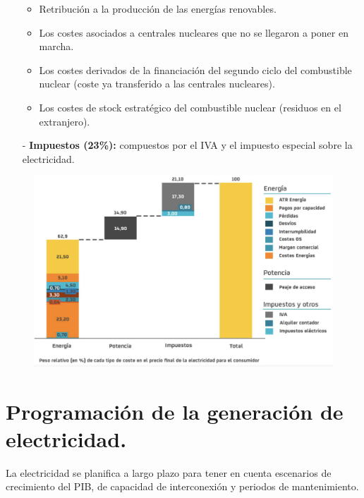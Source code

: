 \begin{itemize}
	\begin{itemize}
		\item Retribución a la producción de las energías renovables.
		\item Los costes asociados a centrales nucleares que no se llegaron a poner en marcha.
		\item Los costes derivados de la financiación del segundo ciclo del combustible nuclear (coste ya transferido a las centrales nucleares).
		\item Los costes de stock estratégico del combustible nuclear (residuos en el extranjero).
	\end{itemize}
	\item [-]\textbf{Impuestos (23\%):} compuestos por el IVA y el impuesto especial sobre la electricidad.
	
\end{itemize}
\begin{figure}[H]
	\centering
	\includegraphics[width=0.7\linewidth]{res/tema4/pvpc}
	\label{fig:pvpc}
\end{figure}
\newpage
\section{Programación de la generación de electricidad.}
La electricidad se planifica a largo plazo para tener en cuenta escenarios de crecimiento del PIB, de capacidad de interconexión y periodos de mantenimiento.
